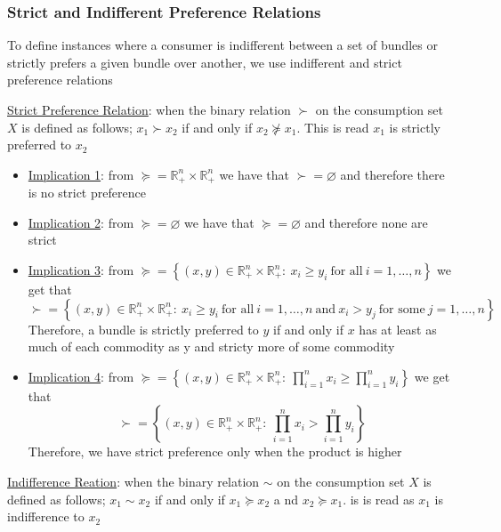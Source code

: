 \documentclass{article}
\begin{document}
\subsubsection{Strict and Indifferent Preference Relations}
To define instances where a consumer is indifferent between a set of bundles or strictly prefers a given bundle over another, we use indifferent and strict preference relations \par \vspace{0.3em}
  \underline{Strict Preference Relation}: when the binary relation $\succ$ on the consumption set $X$ is defined as follows; $x_{1} \succ x_{2}$ if and only if $x_{2} \nsucceq x_{1}$. This is read $x_{1}$ is strictly preferred to $x_{2}$
  \begin{itemize}
    \item  \underline{Implication 1}: from $\succeq = \mathbb{R}_{+}^{n} \times \mathbb{R}_{+}^{n}$ we have that $\succ = \varnothing$ and therefore there is no strict preference
    \item  \underline{Implication 2}: from $\succeq = \varnothing$ we have that $\succeq = \varnothing$ and therefore none are strict
    \item  \underline{Implication 3}: from $\succeq = \left\{ (x,y) \in \mathbb{R}_{+}^{n} \times \mathbb{R}_{+}^{n}: \ x_{i} \geq y_{i} \ \text{for all} \ i = 1, \dots, n \right\}$ we get that $$\succ = \left\{ (x,y) \in \mathbb{R}_{+}^{n} \times \mathbb{R}_{+}^{n}: \ x_{i} \geq y_{i} \ \text{for all} \ i = 1, \dots, n \ \text{and} \ x_{i}>y_{j} \ \text{for some} \ j = 1, \dots, n \right\}$$Therefore, a bundle is strictly preferred to $y$ if and only if $x$ has  at least as much of each commodity as y and stricty more of some commodity
    \item  \underline{Implication 4}: from $\succeq = \left\{ (x,y) \in \mathbb{R}_{+}^{n} \times \mathbb{R}_{+}^{n}: \ \prod_{i=1}^{n} x_{i} \geq \prod_{i=1}^{n} y_{i} \right\}$ we get that $$\succ = \left\{ (x,y) \in \mathbb{R}_{+}^{n} \times \mathbb{R}_{+}^{n}: \ \prod_{i=1}^{n} x_{i} > \prod_{i=1}^{n} y_{i} \right\}$$Therefore, we have strict preference only when the product is higher
  \end{itemize}
  \par
  \underline{Indifference Reation}: when the binary relation $\sim$ on the consumption set $X$ is defined as follows; $x_{1} \sim x_{2}$ if and only if $x_{1} \succeq x_{2}$ a nd $x_{2} \succeq x_{1}$. is is read as $x_{1}$ is indifference to $x_{2}$
\end{document}
